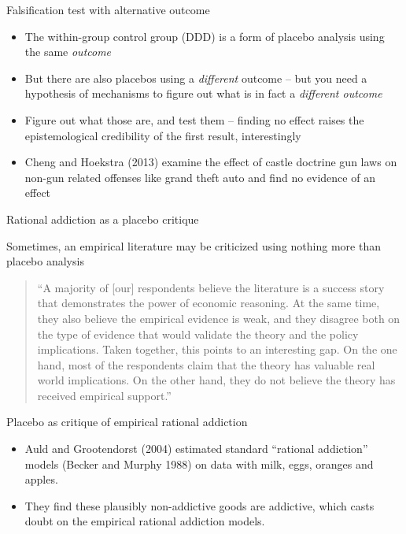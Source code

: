 \documentclass{beamer}
\begin{document}
\begin{frame}{Falsification test with alternative outcome}
	
	\begin{itemize}
	\item The within-group control group (DDD) is a form of placebo analysis using the same \emph{outcome}
	\item But there are also placebos using a \emph{different} outcome -- but you need a hypothesis of mechanisms to figure out what is in fact a \emph{different outcome}
	\item Figure out what those are, and test them -- finding no effect raises the epistemological credibility of the first result, interestingly
	\item Cheng and Hoekstra (2013) examine the effect of castle doctrine gun laws on non-gun related offenses like grand theft auto and find no evidence of an effect
	\end{itemize}
\end{frame}



\begin{frame}{Rational addiction as a placebo critique}


Sometimes, an empirical literature may be criticized using nothing more than placebo analysis

\begin{quote}``A majority of [our] respondents believe the literature is a success story that demonstrates the power of economic reasoning.  At the same time, they also believe the empirical evidence is weak, and they disagree both on the type of evidence that would validate the theory and the policy implications. Taken together, this points to an interesting gap.  On the one hand, most of the respondents claim that the theory has valuable real world implications.  On the other hand, they do not believe the theory has received empirical support.''
\end{quote}

\end{frame}

\begin{frame}{Placebo as critique of empirical rational addiction}

\begin{itemize}
	\item Auld and Grootendorst (2004) estimated standard ``rational addiction'' models (Becker and Murphy 1988) on data with milk, eggs, oranges and apples.  
	\item They find these plausibly non-addictive goods are addictive, which casts doubt on the empirical rational addiction models.
\end{itemize}

\end{frame}
\end{document}
